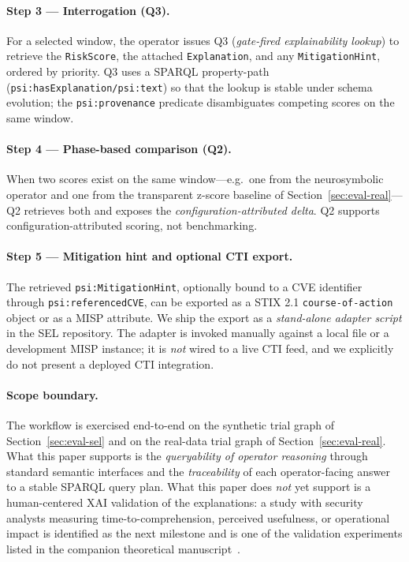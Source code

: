 \documentclass[futureinternet,article,submit,pdftex,moreauthors]{Definitions/mdpi}
\begin{document}
\paragraph{Step 3 --- Interrogation (Q3).} For a selected window, the
operator issues Q3 (\emph{gate-fired explainability lookup}) to retrieve
the \texttt{RiskScore}, the attached \texttt{Explanation}, and any
\texttt{MitigationHint}, ordered by priority. Q3 uses a SPARQL
property-path (\texttt{psi:hasExplanation/psi:text}) so that the lookup
is stable under schema evolution; the \texttt{psi:provenance} predicate
disambiguates competing scores on the same window.

\paragraph{Step 4 --- Phase-based comparison (Q2).} When two scores
exist on the same window---e.g.\ one from the neurosymbolic operator and
one from the transparent z-score baseline of
Section~\ref{sec:eval-real}---Q2 retrieves both and exposes the
\emph{configuration-attributed delta}. Q2 supports
configuration-attributed scoring, not benchmarking.

\paragraph{Step 5 --- Mitigation hint and optional CTI export.} The
retrieved \texttt{psi:MitigationHint}, optionally bound to a CVE
identifier through \texttt{psi:referencedCVE}, can be exported as a
STIX 2.1 \texttt{course-of-action} object or as a MISP attribute. We
ship the export as a \emph{stand-alone adapter script} in the SEL
repository. The adapter is invoked manually against a local file or a
development MISP instance; it is \emph{not} wired to a live CTI feed,
and we explicitly do not present a deployed CTI integration.

\paragraph{Scope boundary.} The workflow is exercised end-to-end on the
synthetic trial graph of Section~\ref{sec:eval-sel} and on the
real-data trial graph of Section~\ref{sec:eval-real}. What this paper
supports is the \emph{queryability of operator reasoning} through
standard semantic interfaces and the \emph{traceability} of each
operator-facing answer to a stable SPARQL query plan. What this paper
does \emph{not} yet support is a human-centered XAI validation of the
explanations: a study with security analysts measuring
time-to-comprehension, perceived usefulness, or operational impact is
identified as the next milestone and is one of the validation
experiments listed in the companion theoretical
manuscript~\cite{paper5}.
\end{document}
